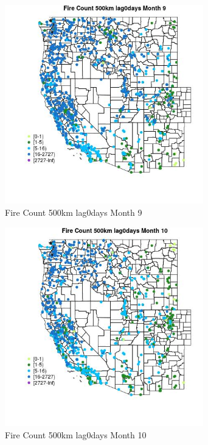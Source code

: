 \begin{figure} 
\centering  
\includegraphics[width=0.77\textwidth]{Code_Outputs/Report_ML_input_PM25_Step4_part_f_de_duplicated_aves_prioritize_24hr_obswNAs_MapObsMo9Fire_Count_500km_lag0days.jpg} 
\caption{\label{fig:Report_ML_input_PM25_Step4_part_f_de_duplicated_aves_prioritize_24hr_obswNAsMapObsMo9Fire_Count_500km_lag0days}Fire Count 500km lag0days Month 9} 
\end{figure} 
 

\begin{figure} 
\centering  
\includegraphics[width=0.77\textwidth]{Code_Outputs/Report_ML_input_PM25_Step4_part_f_de_duplicated_aves_prioritize_24hr_obswNAs_MapObsMo10Fire_Count_500km_lag0days.jpg} 
\caption{\label{fig:Report_ML_input_PM25_Step4_part_f_de_duplicated_aves_prioritize_24hr_obswNAsMapObsMo10Fire_Count_500km_lag0days}Fire Count 500km lag0days Month 10} 
\end{figure} 
 

